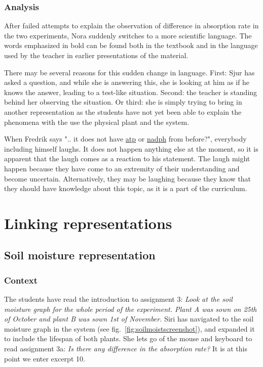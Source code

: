 \subsubsection*{Analysis}
After failed attempts to explain the observation of difference in absorption rate in the two experiments, Nora suddenly switches to a more scientific language. The words emphasized in bold can be found both in the textbook and in the language used by the teacher in earlier presentations of the material.

There may be several reasons for this sudden change in language. First: Sjur has asked a question, and while she is answering this, she is looking at him as if he knows the answer, leading to a test-like situation. Second: the teacher is standing behind her observing the situation. Or third: she is simply trying to bring in another representation as the students have not yet been able to explain the phenomena with the use the physical plant and the system. 

When Fredrik says ".. it does not have \underline{atp} or \underline{nadph} from before?", everybody including himself laughs. It does not happen anything else at the moment, so it is apparent that the laugh comes as a reaction to his statement. The laugh might happen because they have come to an extremity of their understanding and become uncertain. Alternatively, they may be laughing because they know that they should have knowledge about this topic, as it is a part of the curriculum.


\section{Linking representations}
\label{cha:linking}
\subsection{Soil moisture representation}


\subsubsection*{Context}
The students have read the introduction to assignment 3: \emph{Look at the soil moisture graph for the whole period of the experiment. Plant A was sown on 25th of October and plant B was sown 1st of November.} Siri has navigated to the soil moisture graph in the system (see fig.~\ref{fig:soilmoistscreenshot}), and expanded it to include the lifespan of both plants. She lets go of the mouse and keyboard to read assignment 3a: \emph{Is there any difference in the absorption rate?} It is at this point we enter excerpt 10.



